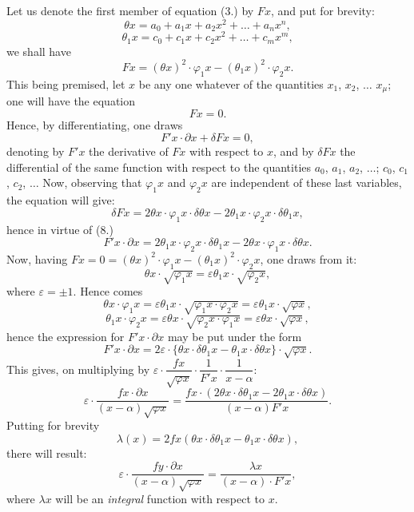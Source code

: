 \documentclass{article}
\begin{document}
Let us denote the first member of equation (3.) by $Fx$, and put for brevity:
\[ \theta x = a_0 + a_1x + a_2x^{2} + \ldots + a_nx^{n}, \tag{5} \]
\[ \theta_1 x = c_0 + c_1x + c_2x^{2} + \ldots + c_mx^{m}, \]
we shall have
\[ Fx = (\theta x)^{2} \cdot \varphi_1 x - (\theta_1 x)^{2} \cdot \varphi_2 x. \tag{6} \]
This being premised, let $x$ be any one whatever of the quantities $x_1$, $x_2$, $\ldots$ $x_\mu$; one will have the equation
\[ Fx = 0. \tag{7} \]
Hence, by differentiating, one draws
\[ F'x \cdot \partial x + \delta Fx = 0, \tag{8} \]
denoting by $F'x$ the derivative of $Fx$ with respect to $x$, and by $\delta Fx$ the differential of the same function with respect to the quantities $a_0$, $a_1$, $a_2$, $\ldots$; $c_0$, $c_1$, $c_2$, $\ldots$ Now, observing that $\varphi_1 x$ and $\varphi_2 x$ are independent of these last variables, the equation will give:
\[ \delta Fx = 2\theta x \cdot \varphi_1 x \cdot \delta\theta x - 2\theta_1 x \cdot \varphi_2 x \cdot \delta\theta_1 x, \tag{9} \]
hence in virtue of (8.)
\[ F'x \cdot \partial x = 2\theta_1 x \cdot \varphi_2 x \cdot \delta\theta_1 x - 2\theta x \cdot \varphi_1 x \cdot \delta\theta x. \tag{10} \]
Now, having $Fx = 0 = (\theta x)^{2} \cdot \varphi_1 x - (\theta_1 x)^{2} \cdot \varphi_2 x$, one draws from it:
\[ \theta x \cdot \sqrt{\varphi_1 x} = \varepsilon\theta_1 x \cdot \sqrt{\varphi_2 x}, \tag{11} \]
where $\varepsilon = \pm 1$. Hence comes
\[ \theta x \cdot \varphi_1 x = \varepsilon\theta_1 x \cdot \sqrt{\varphi_1 x \cdot \varphi_2 x} = \varepsilon\theta_1 x \cdot \sqrt{\varphi x}, \]
\[ \theta_1 x \cdot \varphi_2 x = \varepsilon\theta x \cdot \sqrt{\varphi_2 x \cdot \varphi_1 x} = \varepsilon\theta x \cdot \sqrt{\varphi x}, \]
hence the expression for $F'x \cdot \partial x$ may be put under the form
\[ F'x \cdot \partial x = 2\varepsilon \cdot \{\theta x \cdot \delta\theta_1 x - \theta_1 x \cdot \delta\theta x\} \cdot \sqrt{\varphi x}. \tag{12} \]
This gives, on multiplying by $\varepsilon \cdot \dfrac{fx}{\sqrt{\varphi x}} \cdot \dfrac{1}{F'x} \cdot \dfrac{1}{x-\alpha}$:
\[ \varepsilon \cdot \frac{fx \cdot \partial x}{(x-\alpha)\sqrt{\varphi x}} = \frac{fx \cdot (2\theta x \cdot \delta\theta_1 x - 2\theta_1 x \cdot \delta\theta x)}{(x-\alpha)F'x}. \tag{13} \]
Putting for brevity
\[ \lambda(x) = 2fx(\theta x \cdot \delta\theta_1 x - \theta_1 x \cdot \delta\theta x), \tag{14'} \]
there will result:
\[ \varepsilon \cdot \frac{fy \cdot \partial x}{(x-\alpha)\sqrt{\varphi x}} = \frac{\lambda x}{(x-\alpha) \cdot F'x}, \tag{14} \]
where $\lambda x$ will be an \emph{integral} function with respect to $x$.
\end{document}
